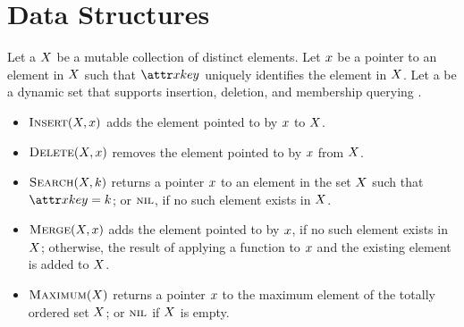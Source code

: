 \chapter{Data Structures}\label{ch:data-structures}

Let a  $X$ be a mutable collection of distinct elements. Let $x$ be a pointer to an element in $X$ such that $\aSomeElementKey$ uniquely identifies the element in $X$. Let a  be a dynamic set that supports insertion, deletion, and membership querying \citep{Cormen2022}.
%
\begin{itemize}
  \item $\cInsert[\vSomeSet, \vSomeElement]$ adds the element pointed to by $x$ to $X$.
  \item $\cDelete[\vSomeSet, \vSomeElement]$ removes the element pointed to by $x$ from $X$.
  \item $\cSearch[\vSomeSet, \vKey]$ returns a pointer $x$ to an element in the set $X$ such that $\aSomeElementKey \equals \vKey$; or $\textsc{nil}$, if no such element exists in $X$.
  \item $\cMerge[\vSomeSet, \vSomeElement]$ adds the element pointed to by $x$, if no such element exists in $X$; otherwise, the result of applying a function to $x$ and the existing element is added to $X$.
  \item $\cMaximum[\vSomeSet]$ returns a pointer $x$ to the maximum element of the totally ordered set $X$; or $\textsc{nil}$ if $X$ is empty.
\end{itemize}